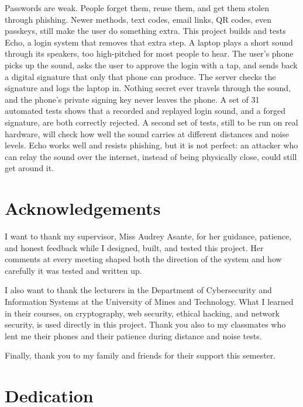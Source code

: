 Passwords are weak. People forget them, reuse them, and get them stolen
through phishing. Newer methods, text codes, email links, QR codes, even
passkeys, still make the user do something extra. This project builds and
tests Echo, a login system that removes that extra step. A laptop plays a short sound through
its speakers, too high-pitched for most people to hear. The user's phone
picks up the sound, asks the user to approve the login with a tap, and
sends back a digital signature that only that phone can produce. The
server checks the signature and logs the laptop in. Nothing secret ever
travels through the sound, and the phone's private signing key never
leaves the phone. A set of 31 automated tests
shows that a recorded and replayed login sound, and a forged signature,
are both correctly rejected. A second set of tests, still to be run on
real hardware, will check how well the sound carries at different
distances and noise levels. Echo works well and resists phishing, but it
is not perfect: an attacker who can relay the sound over the internet,
instead of being physically close, could still get around it.

\clearpage

\chapter*{Acknowledgements}

I want to thank my supervisor, Miss Audrey Asante, for her guidance,
patience, and honest feedback while I designed, built, and tested this
project. Her comments at every meeting shaped both the direction of the
system and how carefully it was tested and written up.

I also want to thank the lecturers in the Department of Cybersecurity and
Information Systems at the University of Mines and Technology. What I
learned in their courses, on cryptography, web security, ethical hacking,
and network security, is used directly in this project. Thank you also to
my classmates who lent me their phones and their patience during distance
and noise tests.

Finally, thank you to my family and friends for their support this
semester.

\clearpage

\chapter*{Dedication}

